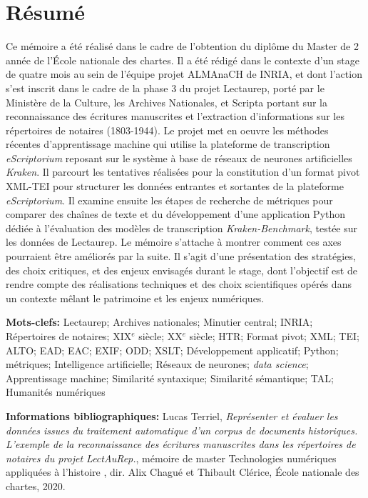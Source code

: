 \chapter*{Résumé}
Ce mémoire a été réalisé dans le cadre de l'obtention du diplôme du Master de 2 année  de l'École nationale des chartes. 
Il a été rédigé dans le contexte d'un stage de quatre mois au sein de l'équipe projet ALMAnaCH de INRIA, et dont l'action  s'est inscrit dans le cadre de la phase 3 du projet Lectaurep, porté par le Ministère de la Culture, les Archives Nationales, et Scripta portant sur la reconnaissance des écritures manuscrites et l'extraction d'informations sur les répertoires de notaires (1803-1944). Le projet met en oeuvre les méthodes récentes d'apprentissage machine qui utilise la plateforme de transcription \textit{eScriptorium} reposant sur le système à base de réseaux de neurones artificielles \textit{Kraken}. Il parcourt les tentatives réalisées pour la constitution d'un format pivot XML-TEI pour structurer les données entrantes et sortantes de la plateforme \textit{eScriptorium}. Il examine ensuite les étapes de recherche de métriques pour comparer des chaînes de texte et du développement d'une application Python dédiée à l'évaluation des modèles de transcription \textit{Kraken-Benchmark}, testée sur les données de Lectaurep. Le mémoire s'attache à montrer comment ces axes pourraient être améliorés par la suite. Il s'agit d'une présentation des stratégies, des choix critiques, et des enjeux envisagés durant le stage, dont l'objectif est de rendre compte des réalisations techniques et des choix scientifiques opérés dans un contexte mêlant le patrimoine et les enjeux numériques. 

\bigskip
\textbf{Mots-clefs:} Lectaurep; Archives nationales; Minutier central; INRIA; Répertoires de notaires; XIX$^{e}$ siècle; XX$^{e}$ siècle; HTR; Format pivot; XML; TEI; ALTO; EAD; EAC; EXIF; ODD; XSLT; Développement applicatif; Python; métriques; Intelligence artificielle; Réseaux de neurones; \textit{data science}; Apprentissage machine; Similarité syntaxique; Similarité sémantique; TAL; Humanités numériques

\bigskip
\bigskip
\bigskip

\textbf{Informations bibliographiques:} Lucas Terriel, \textit{Représenter et évaluer les données issues du traitement automatique d'un corpus de documents historiques. L'exemple de la reconnaissance des écritures manuscrites dans les répertoires de notaires du projet LectAuRep.}, mémoire de master \og Technologies numériques appliquées à l'histoire \fg{}, dir. Alix Chagué et Thibault Clérice, École nationale des chartes, 2020.

\clearpage
\thispagestyle{empty}
\cleardoublepage
